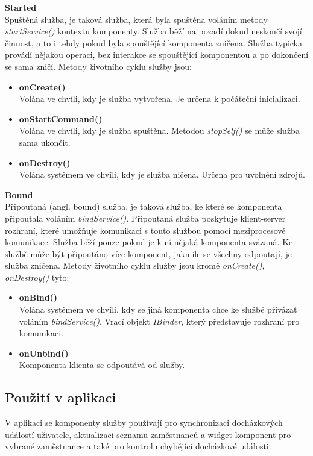 \documentclass{diplomka}
\begin{document}
\begin{description}[]
\item \textbf{Started}\\
Spuštěná služba, je taková služba, která byla spuštěna voláním metody \emph{startService()} kontextu komponenty. Služba běží na pozadí dokud neskončí svojí činnost, a to i tehdy pokud byla spouštějící komponenta zničena. Služba typicka provádí nějakou operaci, bez interakce se spouštějící komponentou a po dokončení se sama zničí. Metody životního cyklu služby jsou: 
\begin{itemize}[]
\item \textbf{onCreate()}\\
Volána ve chvíli, kdy je služba vytvořena. Je určena k počáteční inicializaci.
\item \textbf{onStartCommand()}\\
Volána ve chvíli, kdy je služba spuštěna. Metodou \emph{stopSelf()} se může služba sama ukončit.
\item \textbf{onDestroy()}\\
Volána systémem ve chvíli, kdy je služba ničena. Určena pro uvolnění zdrojů.
\end{itemize}
\item \textbf{Bound}\\
Připoutaná (angl. bound) služba, je taková služba, ke které se komponenta připoutala voláním \emph{bindService()}. Připoutaná služba poskytuje klient-server rozhraní, které umožňuje komunikaci s touto službou pomocí meziprocesové komunikace. Služba běží pouze pokud je k ní nějaká komponenta svázaná. Ke službě může být připoutáno více komponent, jakmile se všechny odpoutají, je služba zničena. Metody životního cyklu služby jsou kromě \emph{onCreate()}, \emph{onDestroy()} tyto:
\begin{itemize}[]
\item \textbf{onBind()}\\
Volána systémem ve chvíli, kdy se jiná komponenta chce ke službě přivázat voláním \emph{bindService()}. Vrací objekt \emph{IBinder}, který představuje rozhraní pro komunikaci.
\item \textbf{onUnbind()}\\
Komponenta klienta se odpoutává od služby.
\end{itemize}
\end{description}
\subsection*{Použití v aplikaci}
V aplikaci se komponenty služby používají pro synchronizaci docházkových událostí uživatele, aktualizaci seznamu zaměstnanců a widget komponent pro vybrané zaměstnance a také pro kontrolu chybějící docházkové události.
\end{document}
